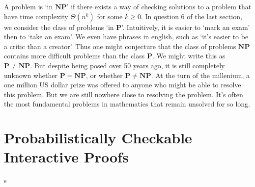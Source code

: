 \documentclass[answers]{exam}
\begin{document}
A problem is `in $\mathbf{NP}$' if there exists a way of checking solutions to a problem that have time complexity $\Theta(n^k)$ for some $k \geq 0$. In question 6 of the last section, we consider the class of problems `in $\mathbf{P}$'. Intuitively, it is easier to `mark an exam' then to `take an exam'. We even have phrases in english, such as `it's easier to be a critic than a creator'. Thus one might conjecture that the class of problems $\mathbf{NP}$ contains more difficult problems than the class $\mathbf{P}$. We might write this as $\mathbf{P} \neq \mathbf{NP}$. But despite being posed over 50 years ago, it is still completely unknown whether $\mathbf{P} = \mathbf{NP}$, or whether $\mathbf{P} \neq \mathbf{NP}$. At the turn of the millenium, a one million US dollar prize was offered to anyone who might be able to resolve this problem. But we are still nowhere close to resolving the problem. It's often the most fundamental problems in mathematics that remain unsolved for so long.

\section{Probabilistically Checkable Interactive Proofs}

s
\end{document}
